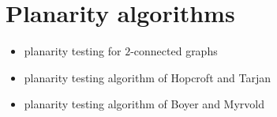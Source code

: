 
\section{Planarity algorithms}

\begin{itemize}
\item planarity testing for $2$-connected graphs

\item planarity testing algorithm of Hopcroft and
  Tarjan~\cite{HopcroftTarjan1974}

\item planarity testing algorithm of Boyer and
  Myrvold~\cite{BoyerMyrvold2004}
\end{itemize}
